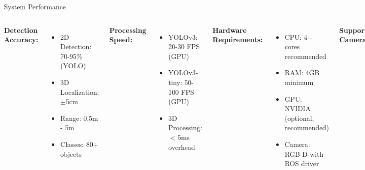 \documentclass[aspectratio=169]{beamer}
\begin{document}
\begin{frame}{System Performance}
\begin{columns}
\textbf{Detection Accuracy:}
\begin{itemize}
    \item 2D Detection: 70-95\% (YOLO)
    \item 3D Localization: $\pm$5cm
    \item Range: 0.5m - 5m
    \item Classes: 80+ objects
\end{itemize}

\vspace{1em}
\textbf{Processing Speed:}
\begin{itemize}
    \item YOLOv3: 20-30 FPS (GPU)
    \item YOLOv3-tiny: 50-100 FPS (GPU)
    \item 3D Processing: $<$5ms overhead
\end{itemize}

\textbf{Hardware Requirements:}
\begin{itemize}
    \item CPU: 4+ cores recommended
    \item RAM: 4GB minimum
    \item GPU: NVIDIA (optional, recommended)
    \item Camera: RGB-D with ROS driver
\end{itemize}

\vspace{1em}
\textbf{Supported Cameras:}
\begin{itemize}
    \item Intel RealSense D435/D455
    \item Asus Xtion Pro
    \item Orbbec Astra
    \item Any with PointCloud2 output
\end{itemize}
\end{columns}
\end{frame}
\end{document}
